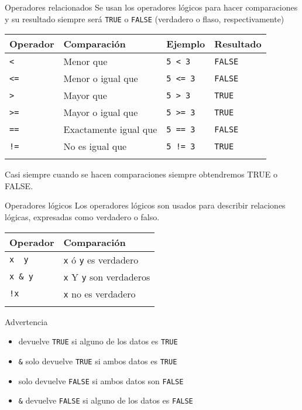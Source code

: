 \documentclass[
  ignorenonframetext,
]{beamer}
\begin{document}
\begin{frame}[fragile]{Operadores relacionados}
\label{operadores-relacionados}
Se usan los operadores lógicos para hacer comparaciones y su resultado
siempre será \texttt{TRUE} o \texttt{FALSE} (verdadero o flaso,
respectivamente)

\begin{longtable}[]{@{}llll@{}}
\toprule\noalign{}
Operador & Comparación & Ejemplo & Resultado \\
\midrule\noalign{}
\endhead
\texttt{\textless{}} & Menor que & \texttt{5\ \textless{}\ 3} &
\texttt{FALSE} \\
\texttt{\textless{}=} & Menor o igual que & \texttt{5\ \textless{}=\ 3}
& \texttt{FALSE} \\
\texttt{\textgreater{}} & Mayor que & \texttt{5\ \textgreater{}\ 3} &
\texttt{TRUE} \\
\texttt{\textgreater{}=} & Mayor o igual que &
\texttt{5\ \textgreater{}=\ 3} & \texttt{TRUE} \\
\texttt{==} & Exactamente igual que & \texttt{5\ ==\ 3} &
\texttt{FALSE} \\
\texttt{!=} & No es igual que & \texttt{5\ !=\ 3} & \texttt{TRUE} \\
\bottomrule\noalign{}
\end{longtable}

Casi siempre cuando se hacen comparaciones siempre obtendremos TRUE o
FALSE.
\end{frame}

\begin{frame}[fragile]{Operadores lógicos}
\label{operadores-luxf3gicos}
Los operadores lógicos son usados para describir relaciones lógicas,
expresadas como verdadero o falso.

\begin{longtable}[]{@{}ll@{}}
\toprule\noalign{}
Operador & Comparación \\
\midrule\noalign{}
\endhead
\texttt{x\ \textbar{}\ y} & \texttt{x} ó \texttt{y} es verdadero \\
\texttt{x\ \&\ y} & \texttt{x} Y \texttt{y} son verdaderos \\
\texttt{!x} & \texttt{x} no es verdadero \\
\bottomrule\noalign{}
\end{longtable}

\begin{block}{Advertencia}
\label{advertencia}
\begin{itemize}
\item
  \texttt{\textbar{}} devuelve \texttt{TRUE} si alguno de los datos es
  \texttt{TRUE}
\item
  \texttt{\&} solo devuelve \texttt{TRUE} si ambos datos es
  \texttt{TRUE}
\item
  \texttt{\textbar{}} solo devuelve \texttt{FALSE} si ambos datos son
  \texttt{FALSE}
\item
  \texttt{\&} devuelve \texttt{FALSE} si alguno de los datos es
  \texttt{FALSE}
\end{itemize}
\end{block}
\end{frame}
\end{document}
